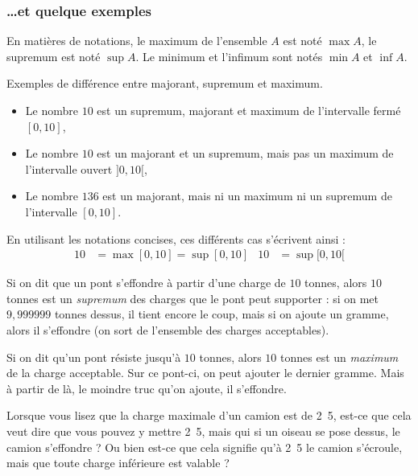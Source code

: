 \subsubsection{\ldots et quelque exemples}

En matières de notations, le maximum de l'ensemble $A$ est noté $\max A$, le supremum est noté $\sup A$. Le minimum et l'infimum sont notés $\min A$ et $\inf A$.

\begin{example}
Exemples de différence entre majorant, supremum et maximum.
\begin{itemize}
\item Le nombre $10$ est un supremum, majorant et maximum de l'intervalle fermé $[0,10]$,
\item Le nombre $10$ est un majorant et un supremum, mais pas un maximum de l'intervalle ouvert $]0,10[$,
\item Le nombre $136$ est un majorant, mais ni un maximum ni un supremum de l'intervalle $[0,10]$.
\end{itemize}
\end{example}

En utilisant les notations concises, ces différents cas s'écrivent ainsi :
\begin{align*}
10&=\max[0,10]=\sup[0,10]	& 10&=\sup[0,10[
\end{align*}


\begin{example}
Si on dit que un pont s'effondre à partir d'une charge de $10$ tonnes, alors $10$ tonnes est un \emph{supremum} des charges que le pont peut supporter : si on met $9,999999$ tonnes dessus, il tient encore le coup, mais si on ajoute un gramme, alors il s'effondre (on sort de l'ensemble des charges acceptables).
\end{example}

\begin{example}
Si on dit qu'un pont résiste jusqu'à $10$ tonnes, alors $10$ tonnes est un \emph{maximum} de la charge acceptable. Sur ce pont-ci, on peut ajouter le dernier gramme. Mais à partir de là, le moindre truc qu'on ajoute, il s'effondre.
\end{example}

Lorsque vous lisez que la charge maximale d'un camion est de \unit{2.5}{\ton}, est-ce que cela veut dire que vous pouvez y mettre \unit{2.5}{\ton}, mais qui si un oiseau se pose dessus, le camion s'effondre ? Ou bien est-ce que cela signifie qu'à \unit{2.5}{\ton} le camion s'écroule, mais que toute charge inférieure est valable ?

